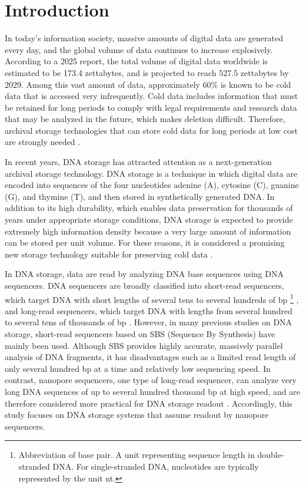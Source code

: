 \documentclass[sotsuron]{kuee}
\begin{document}
\chapter{Introduction}
In today's information society, massive amounts of digital data are generated
every day, and the global volume of data continues to increase explosively.
According to a 2025 report, the total volume of digital data worldwide is
estimated to be 173.4 zettabytes, and is projected to reach 527.5 zettabytes
by 2029\cite{statista_worldwide_data_created}.
Among this vast amount of data, approximately 60\% is known to be cold data
that is accessed very infrequently\cite{dna_data_storage_alliance_2021_intro}.
Cold data includes information that must be retained for long periods to comply
with legal requirements and research data that may be analyzed in the future,
which makes deletion difficult.
Therefore, archival storage technologies that can store cold data for long
periods at low cost are strongly needed
\cite{reinsel2017dataage2025,dna_data_storage_alliance_2021_intro}.

In recent years, DNA storage has attracted attention as a next-generation
archival storage technology.
DNA storage is a technique in which digital data are encoded into sequences of
the four nucleotides adenine (A), cytosine (C), guanine (G), and thymine (T),
and then stored in synthetically generated DNA.
In addition to its high durability, which enables data preservation for
thousands of years under appropriate storage conditions, DNA storage is
expected to provide extremely high information density because a very large
amount of information can be stored per unit volume.
For these reasons, it is considered a promising new storage technology suitable
for preserving cold data
\cite{akash2024_applicable,Ceze2019,dna_data_storage_alliance_2021_intro}.

In DNA storage, data are read by analyzing DNA base sequences using DNA
sequencers\cite{Ceze2019}.
DNA sequencers are broadly classified into short-read sequencers, which target
DNA with short lengths of several tens to several hundreds of bp
\footnote{Abbreviation of base pair. A unit representing sequence length in
double-stranded DNA. For single-stranded DNA, nucleotides are typically
represented by the unit nt.}
\cite{Simon2009}, and long-read sequencers, which target DNA with lengths from
several hundred to several tens of thousands of bp \cite{Amarasinghe2020}.
However, in many previous studies on DNA storage, short-read sequencers based
on SBS (Sequence By Synthesis)\cite{SBS} have mainly been used.
Although SBS provides highly accurate, massively parallel analysis of DNA
fragments, it has disadvantages such as a limited read length of only several
hundred bp at a time and relatively low sequencing speed\cite{SBS}.
In contrast, nanopore sequencers, one type of long-read sequencer, can analyze
very long DNA sequences of up to several hundred thousand bp at high speed,
and are therefore considered more practical for DNA storage readout
\cite{Amarasinghe2020}.
Accordingly, this study focuses on DNA storage systems that assume readout by
nanopore sequencers.
\end{document}
